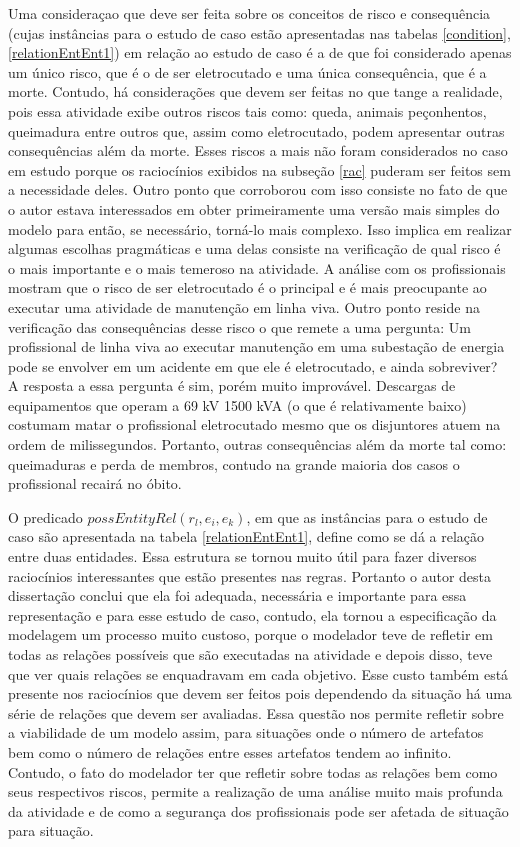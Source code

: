 Uma consideraçao que deve ser feita sobre os conceitos de risco e consequência (cujas instâncias para o estudo de caso estão apresentadas nas tabelas \ref{condition}, \ref{relationEntEnt1}) em relação ao estudo de caso é a de que foi considerado apenas um único risco, que é o de ser eletrocutado e uma única consequência, que é a morte. Contudo, há considerações que devem ser feitas no que tange a realidade, pois essa atividade exibe outros riscos tais como: queda, animais peçonhentos, queimadura entre outros que, assim como eletrocutado, podem apresentar outras consequências além da morte. Esses riscos a mais não foram considerados no caso em estudo porque os raciocínios exibidos na subseção \ref{rac} puderam ser feitos sem a necessidade deles. Outro ponto que corroborou com isso consiste no fato de que o autor estava interessados em obter primeiramente uma versão mais simples do modelo para então, se necessário, torná-lo mais complexo. Isso implica em realizar algumas escolhas pragmáticas e uma delas consiste na verificação de qual risco é o mais importante e o mais temeroso na atividade. A análise com os profissionais mostram que o risco de ser eletrocutado é o principal e é mais preocupante ao executar uma atividade de manutenção em linha viva. Outro ponto reside na verificação das consequências desse risco o que remete a uma pergunta: Um profissional de linha viva ao executar manutenção em uma subestação de energia pode se envolver em um acidente em que ele é eletrocutado, e ainda sobreviver? A resposta a essa pergunta é sim, porém muito improvável. Descargas de equipamentos que operam a 69 kV 1500 kVA  (o que é relativamente baixo) costumam matar o profissional eletrocutado mesmo que os disjuntores atuem na ordem de milissegundos. Portanto, outras consequências além da morte tal como: queimaduras e perda de membros, contudo na grande maioria dos casos o profissional recairá no óbito. 

O predicado $possEntityRel(r_l,e_i,e_k)$, em que as instâncias para o estudo de caso são apresentada na tabela \ref{relationEntEnt1}, define como se dá a relação entre duas entidades. Essa estrutura se tornou muito útil para fazer diversos raciocínios interessantes que estão presentes nas regras. Portanto o autor desta dissertação conclui que ela foi adequada, necessária e importante para essa representação e para esse estudo de caso, contudo, ela tornou a especificação da modelagem um processo muito custoso, porque o modelador teve de refletir em todas as relações possíveis que são executadas na atividade e depois disso, teve que ver quais relações se enquadravam em cada objetivo. Esse custo também está presente nos raciocínios que devem ser feitos pois dependendo da situação há uma série de relações que devem ser avaliadas. Essa questão nos permite refletir sobre a viabilidade de um modelo assim, para situações onde o número de artefatos bem como o número de relações entre esses artefatos tendem ao infinito. Contudo, o fato do modelador ter que refletir sobre todas as relações bem como seus respectivos riscos, permite a realização de uma análise muito mais profunda da atividade e de como a segurança dos profissionais pode ser afetada de situação para situação. 

